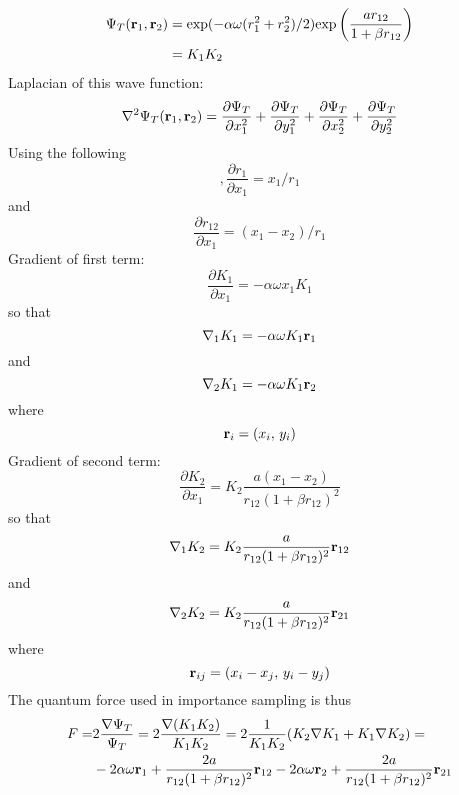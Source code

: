 \documentclass[english, a4paper]{article}
\begin{document}
\begin{align}
 \Psi_T({\bf r}_1, {\bf r}_2) &= \textrm{exp}(-\alpha \omega(r_1^2 + r_2^2)/2)
 \textrm{exp}\left(\frac{a r_{12}}{1 + \beta r_{12}}\right) \\
 &= K_1K_2
\end{align}
Laplacian of this wave function:
\begin{equation}
 \nabla^2 \Psi_T({\bf r}_1, {\bf r}_2) = \frac{\partial \Psi_T}{\partial x_1^2} + 
 \frac{\partial \Psi_T}{\partial y_1^2} + \frac{\partial \Psi_T}{\partial x_2^2} +
 \frac{\partial \Psi_T}{\partial y_2^2}
\end{equation}
Using the following
\begin{equation},
 \frac{\partial r_1}{\partial x_1} = x_1/r_1
\end{equation}
and 
\begin{equation}
 \frac{\partial r_{12}}{\partial x_1} = (x_1 - x_2)/r_1
\end{equation}
Gradient of first term:
\begin{equation}
 \frac{\partial K_1}{\partial x_1} = -\alpha \omega x_1 K_1
\end{equation}
so that
\begin{equation}
 \nabla_1 K_1 = -\alpha\omega K_1 {\bf r}_1
\end{equation}
and 
\begin{equation}
 \nabla_2 K_1 = -\alpha\omega K_1 {\bf r}_2
\end{equation}
where
\begin{equation}
 {\bf r}_i = (x_i,\, y_i)
\end{equation}
Gradient of second term:
\begin{equation}
 \frac{\partial K_2}{\partial x_1} = K_2 \frac{a(x_1 - x_2)}{r_{12}(1 + \beta r_{12})^2}
\end{equation}
so that
\begin{equation}
 \nabla_1 K_2 = 
 K_2 \frac{a}{r_{12}(1 + \beta r_{12})^2} {\bf r}_{12}
\end{equation}
and
\begin{equation}
 \nabla_2 K_2 = 
 K_2 \frac{a}{r_{12}(1 + \beta r_{12})^2} {\bf r}_{21}
\end{equation}
where
\begin{equation}
 {\bf r}_{ij} = (x_i - x_j, \,y_i - y_j)
\end{equation}
The quantum force used in importance sampling is thus
\begin{align}
\begin{split}
 F = &2\frac{\nabla \Psi_T}{\Psi_T} = 2\frac{\nabla(K_1K_2)}{K_1K_2} = 
 2\frac{1}{K_1K_2}(K_2 \nabla K_1 + K_1 \nabla K_2) = \\
 &-2\alpha\omega {\bf r}_1 + \frac{2a}{r_{12}(1 + \beta r_{12})^2} {\bf r}_{12}
 -2\alpha\omega {\bf r}_2 + \frac{2a}{r_{12}(1 + \beta r_{12})^2} {\bf r}_{21}
\end{split}
\end{align}
\end{document}
